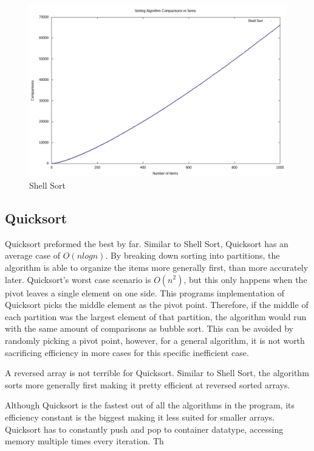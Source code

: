 \documentclass[12pt]{article}
\begin{document}
	\begin{figure}[H]
		\caption{Shell Sort}\label{shell}
		\includegraphics[width=6in]{shell}
		\centering
	\end{figure}

	\pagebreak


	\subsection{Quicksort}

	Quicksort preformed the best by far.
	Similar to Shell Sort, Quicksort has an average case of $O(n log n)$.
	By breaking down sorting into partitions, the algorithm is able to organize the items more generally
	first, than more accurately later.
	Quicksort's worst case scenario is $O(n^2)$, but this only happens when the pivot leaves a single element on one side.
	This programs implementation of Quicksort picks the middle element as the pivot point.
	Therefore, if the middle of each partition was the largest element of that partition, the algorithm would run with the same amount of comparisons as bubble sort.
	This can be avoided by randomly picking a pivot point, however, for a general algorithm, it is not worth sacrificing efficiency in more cases for this specific inefficient case.

	A reversed array is not terrible for Quicksort.
	Similar to Shell Sort, the algorithm sorts more generally first making it pretty efficient at reversed sorted arrays.

	Although Quicksort is the fastest out of all the algorithms in the program, its efficiency constant is the biggest making it less suited for smaller arrays.
	Quicksort has to constantly push and pop to container datatype, accessing memory multiple times every iteration.
	Th
	
\end{document}
